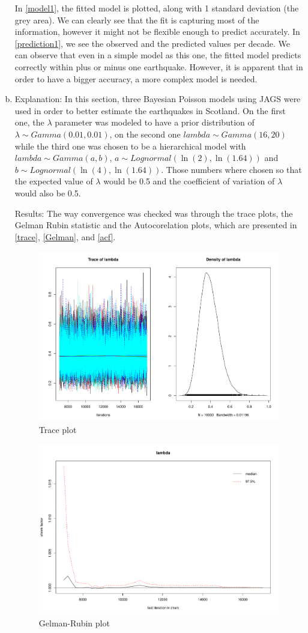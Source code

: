 \documentclass[12pt,a4paper]{article}
\begin{document}
\begin{enumerate}[(a)]
In \autoref{model1}, the fitted model is plotted, along with 1 standard deviation (the grey area). We can clearly see that the fit is capturing most of the information, however it might not be flexible enough to predict accurately.  In \autoref{prediction1}, we see the observed and the predicted values per decade. We can observe that even in a simple model as this one, the fitted model predicts correctly within plus or minus one earthquake. However, it is apparent that in order to have a bigger accuracy, a more complex model is needed.


\item
Explanation: In this section, three Bayesian Poisson models using JAGS were used in order to better estimate the earthquakes in Scotland. On the first one, the $\lambda$ parameter was modeled to have a prior distribution of $\lambda \sim Gamma(0.01,0.01)$, on the second one $lambda \sim Gamma(16,20)$ while the third one was chosen to be a hierarchical model with $lambda \sim Gamma(a,b)$, $a \sim Lognormal(\ln(2),\ln(1.64))$ and $b \sim Lognormal(\ln(4),\ln(1.64))$. Those numbers where chosen so that the expected value of  $\lambda$ would be 0.5 and the coefficient of variation of $\lambda$ would also be 0.5.

Results: The way convergence was checked was through the trace plots, the Gelman Rubin statistic and the Autocorelation plots, which are presented in \autoref{trace}, \autoref{Gelman}, and \autoref{acf}.

\begin{figure}[h]
    \centering
    \includegraphics[width=0.6\linewidth]{figures/Rplot03.pdf}
    \caption{Trace plot}
    \label{trace}
\end{figure}

\begin{figure}[h]
    \centering
    \includegraphics[width=0.6\linewidth]{figures/Rplot04.pdf}
    \caption{Gelman-Rubin plot}
    \label{Gelman}
\end{figure}


\end{enumerate}
\end{document}
